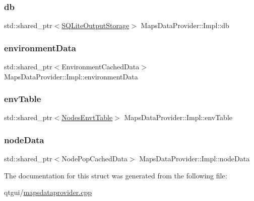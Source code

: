 \mbox{\label{struct_maps_data_provider_1_1_impl_a20f685ff5afdfa3edd4edaae20b63f26}} 
\subsubsection{\texorpdfstring{db}{db}}
{\footnotesize\ttfamily std\+::shared\+\_\+ptr$<$\mbox{\hyperlink{class_s_q_lite_output_storage}{S\+Q\+Lite\+Output\+Storage}}$>$ Maps\+Data\+Provider\+::\+Impl\+::db}

\mbox{\label{struct_maps_data_provider_1_1_impl_a6653c8b9854e10cdf8b76423f99f2074}} 
\subsubsection{\texorpdfstring{environmentData}{environmentData}}
{\footnotesize\ttfamily std\+::shared\+\_\+ptr$<$Environment\+Cached\+Data$>$ Maps\+Data\+Provider\+::\+Impl\+::environment\+Data}

\mbox{\label{struct_maps_data_provider_1_1_impl_afbf7212bfbc549ce4bf00e20ca3d0462}} 
\subsubsection{\texorpdfstring{envTable}{envTable}}
{\footnotesize\ttfamily std\+::shared\+\_\+ptr$<$\mbox{\hyperlink{class_nodes_envt_table}{Nodes\+Envt\+Table}}$>$ Maps\+Data\+Provider\+::\+Impl\+::env\+Table}

\mbox{\label{struct_maps_data_provider_1_1_impl_a976fa35b2efeb4a4fc61b18d3f7b3e6a}} 
\subsubsection{\texorpdfstring{nodeData}{nodeData}}
{\footnotesize\ttfamily std\+::shared\+\_\+ptr$<$Node\+Pop\+Cached\+Data$>$ Maps\+Data\+Provider\+::\+Impl\+::node\+Data}



The documentation for this struct was generated from the following file\+:\begin{DoxyCompactItemize}
\item 
qtgui/\mbox{\hyperlink{mapsdataprovider_8cpp}{mapsdataprovider.\+cpp}}\end{DoxyCompactItemize}

